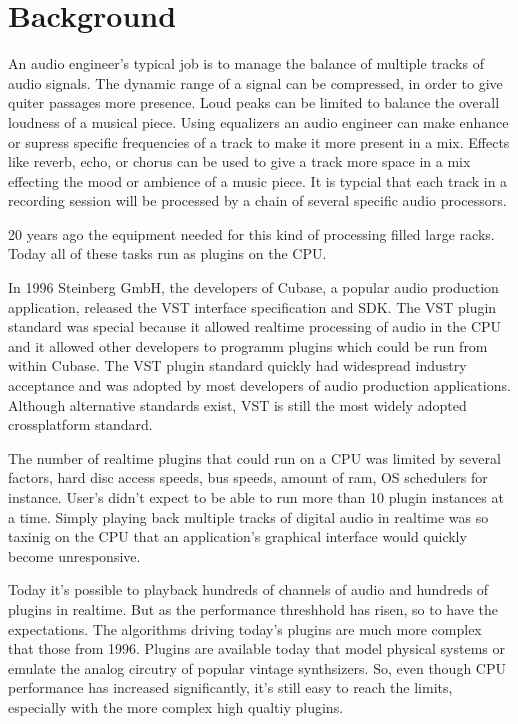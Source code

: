 \section{Background}

An audio engineer's typical job is to manage the balance of multiple tracks of audio signals. The dynamic range of a signal can be compressed, in order to give quiter passages more presence. Loud peaks can be limited to balance the overall loudness of a musical piece. Using equalizers an audio engineer can make enhance or supress specific frequencies of a track to make it more present in a mix. Effects like reverb, echo, or chorus can be used to give a track more space in a mix effecting the mood or ambience of a music piece. It is typcial that each track in a recording session will be processed by a chain of several specific audio processors.

20 years ago the equipment needed for this kind of processing filled large racks. Today all of these tasks run as plugins on the CPU.

In 1996 Steinberg GmbH, the developers of Cubase, a popular audio production application, released the VST interface specification and SDK.\cite{VST-wikipedia} The VST plugin standard was special because it allowed realtime processing of audio in the CPU and it allowed other developers to programm plugins which could be run from within Cubase. The VST plugin standard quickly had widespread industry acceptance and was adopted by most developers of audio production applications. Although alternative standards exist, VST is still the most widely adopted crossplatform standard.

The number of realtime plugins that could run on a CPU was limited by several factors, hard disc access speeds, bus speeds, amount of ram, OS schedulers for instance\cite{brandt1998low}. User's didn't expect to be able to run more than 10 plugin instances at a time. Simply playing back multiple tracks of digital audio in realtime was so taxinig on the CPU that an application's graphical interface would quickly become unresponsive.

Today it's possible to playback hundreds of channels of audio and hundreds of plugins in realtime. But as the performance threshhold has risen, so to have the expectations. The algorithms driving today's plugins are much more complex that those from 1996. Plugins are available today that model physical systems or emulate the analog circutry of popular vintage synthsizers. So, even though CPU performance has increased significantly, it's still easy to reach the limits, especially with the more complex high qualtiy plugins.

